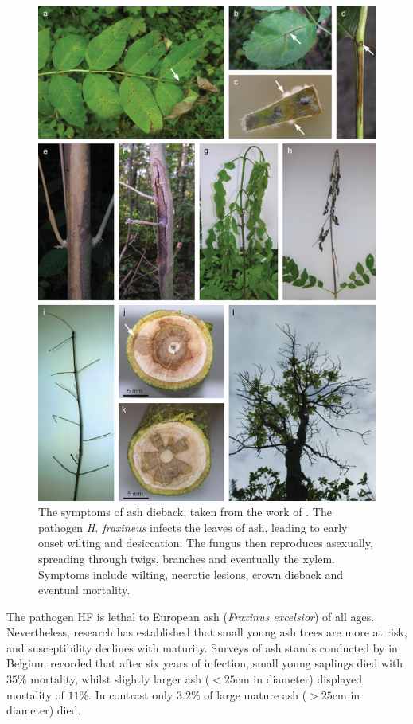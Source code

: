 \begin{figure}
    \centering
    \includegraphics[scale=0.5]{chapter2/figures/gross2014.jpg}
    \caption{
    The symptoms of ash dieback, taken from the work of \cite{gross2014h}. 
    The pathogen \textit{H. fraxineus} infects the leaves of ash, leading to early onset wilting and desiccation. 
    The fungus then reproduces asexually, spreading through twigs, branches and eventually the xylem. 
    Symptoms include wilting, necrotic lesions, crown dieback and eventual mortality.}
    \label{fig:ash-deiback-symptoms}
\end{figure}

The pathogen HF is lethal to European ash (\textit{Fraxinus excelsior}) of all ages. 
Nevertheless, research has established that small young ash trees are more at risk,
and susceptibility declines with maturity. Surveys of ash stands conducted by \cite{marccais2017estimation} 
in Belgium recorded that after six years of infection, small young saplings died with $35\%$ mortality, 
whilst slightly larger ash ($<25 \mathrm{cm}$ in diameter) displayed mortality of $11\%$. 
In contrast only $3.2\%$ of large mature ash ($>25\mathrm{cm}$ in diameter) died.

